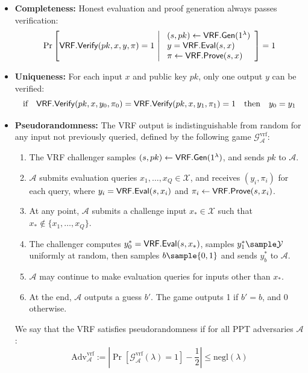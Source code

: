 \begin{itemize}
    \item \textbf{Completeness:} Honest evaluation and proof generation always passes verification:
    \[
    \Pr\left[ \VRFVerify(pk,x,y,\pi) = 1 \ \middle| \ 
    \begin{array}{l}
        (s, pk) \leftarrow \VRFGen(1^\lambda) \\
        y = \VRFEval(s,x) \\
        \pi \leftarrow \VRFProve(s,x)
    \end{array}
    \right] = 1
    \]
    
    \item \textbf{Uniqueness:} For each input $x$ and public key $pk$, only one output $y$ can be verified:
    \[
    \text{if} \quad \mathsf{VRF.Verify}(pk, x, y_0, \pi_0) = \mathsf{VRF.Verify}(pk, x, y_1, \pi_1) = 1 \quad \text{then} \quad y_0 = y_1
    \]
    
    \item \textbf{Pseudorandomness:} The VRF output is indistinguishable from random for any input not previously queried, defined by the following game $\mathcal{G}_{\mathcal{A}}^{\text{vrf}}$:
    \begin{enumerate}
        \item The VRF challenger samples $(s, pk) \leftarrow \mathsf{VRF.Gen}(1^\lambda)$, and sends $pk$ to $\mathcal{A}$.
        \item $\mathcal{A}$ submits evaluation queries $x_1, \ldots, x_Q \in \mathcal{X}$, and receives $(y_i, \pi_i)$ for each query, where $y_i = \mathsf{VRF.Eval}(s, x_i)$ and $\pi_i \leftarrow \mathsf{VRF.Prove}(s, x_i)$.
        \item At any point, $\mathcal{A}$ submits a challenge input $x_* \in \mathcal{X}$ such that $x_* \not\in \{x_1, \ldots, x_Q\}$.
        \item The challenger computes $y_0^* = \mathsf{VRF.Eval}(s, x_*)$, samples $y_1^* \sample \mathcal{Y}$ uniformly at random, then samples $b \sample \{0,1\}$ and sends $y_b^*$ to $\mathcal{A}$.
        \item $\mathcal{A}$ may continue to make evaluation queries for inputs other than $x_*$.
        \item At the end, $\mathcal{A}$ outputs a guess $b'$. The game outputs 1 if $b' = b$, and 0 otherwise.
    \end{enumerate}
    
    We say that the VRF satisfies pseudorandomness if for all PPT adversaries $\mathcal{A}$:
    \[
    \text{Adv}_{\mathcal{A}}^{\text{vrf}} := \left|\Pr\left[\mathcal{G}_{\mathcal{A}}^{\text{vrf}}(\lambda) = 1\right] - \frac{1}{2}\right| \leq \text{negl}(\lambda)
    \]
\end{itemize}


